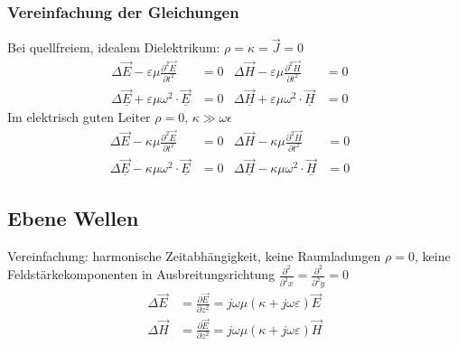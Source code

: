 \subsubsection{Vereinfachung der Gleichungen}
Bei quellfreiem, idealem Dielektrikum: $ \rho = \kappa = \vec{J} = 0$
\begin{align*}
	\Delta \vec{E}-\varepsilon \mu \frac{\partial^{2} \vec{E}}{\partial t^{2}} & =0 & 
	\Delta \vec{H}-\varepsilon \mu \frac{\partial^{2} \vec{H}}{\partial t^{2}} & =0 &\\
	\Delta \underline{\vec{E}}+\varepsilon \mu \omega^{2} \cdot \underline{\vec{E}} & =0 &
	\Delta \underline{\vec{H}}+\varepsilon \mu \omega^{2} \cdot \underline{\vec{H}} & =0 &
\end{align*}
Im elektrisch guten Leiter $\rho = 0,\, \kappa \gg \omega \epsilon$
\begin{align*}
	\Delta \vec{E}-\kappa \mu \frac{\partial^{2} \vec{E}}{\partial t^{2}} & =0 & 
	\Delta \vec{H}-\kappa \mu \frac{\partial^{2} \vec{H}}{\partial t^{2}} & =0 &\\
	\Delta \underline{\vec{E}}-\kappa \mu \omega^{2} \cdot \underline{\vec{E}} & =0 &
	\Delta \underline{\vec{H}}-\kappa \mu \omega^{2} \cdot \underline{\vec{H}} & =0 &
\end{align*}


\subsection{Ebene Wellen}
Vereinfachung: harmonische Zeitabhängigkeit, keine Raumladungen $ \rho = 0 $, keine Feldstärkekomponenten in Ausbreitungsrichtung $ \frac{\partial^2 }{\partial^2 x} = \frac{\partial^2 }{\partial^2 y} = 0 $
\begin{align*}
	\Delta \vec{E} & = \frac{ \partial \vec{E}}{ \partial z^2} = j \omega \mu ( \kappa + j \omega \varepsilon) \vec{E} \\
	\Delta \vec{H} & = \frac{ \partial \vec{E}}{ \partial z^2} = j \omega \mu ( \kappa + j \omega \varepsilon) \vec{H}
\end{align*}

